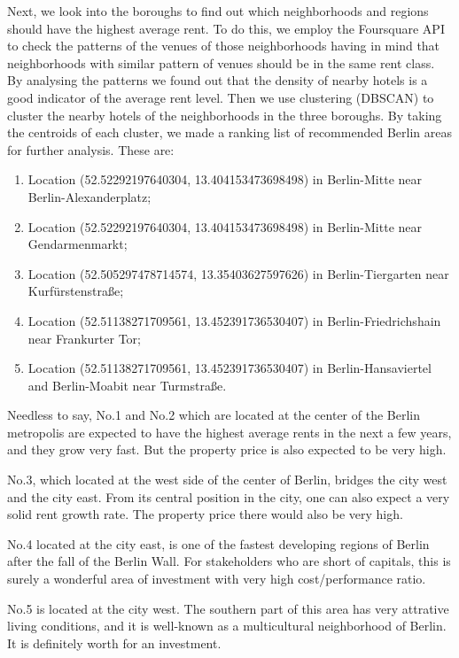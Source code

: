 \documentclass[11pt]{article}
\providecommand{\tightlist}{%
      \setlength{\itemsep}{0pt}\setlength{\parskip}{0pt}}
\begin{document}
    Next, we look into the boroughs to find out which neighborhoods and
regions should have the highest average rent. To do this, we employ the
Foursquare API to check the patterns of the venues of those
neighborhoods having in mind that neighborhoods with similar pattern of
venues should be in the same rent class. By analysing the patterns we
found out that the density of nearby hotels is a good indicator of the
average rent level. Then we use clustering (DBSCAN) to cluster the
nearby hotels of the neighborhoods in the three boroughs. By taking the
centroids of each cluster, we made a ranking list of recommended Berlin
areas for further analysis. These are:

\begin{enumerate}
\def\labelenumi{\arabic{enumi}.}
\tightlist
\item
  Location (52.52292197640304, 13.404153473698498) in Berlin-Mitte near
  Berlin-Alexanderplatz;
\item
  Location (52.52292197640304, 13.404153473698498) in Berlin-Mitte near
  Gendarmenmarkt;
\item
  Location (52.505297478714574, 13.35403627597626) in Berlin-Tiergarten
  near Kurfürstenstraße;
\item
  Location (52.51138271709561, 13.452391736530407) in
  Berlin-Friedrichshain near Frankurter Tor;
\item
  Location (52.51138271709561, 13.452391736530407) in
  Berlin-Hansaviertel and Berlin-Moabit near Turmstraße.
\end{enumerate}

    Needless to say, No.1 and No.2 which are located at the center of the
Berlin metropolis are expected to have the highest average rents in the
next a few years, and they grow very fast. But the property price is
also expected to be very high.

    No.3, which located at the west side of the center of Berlin, bridges
the city west and the city east. From its central position in the city,
one can also expect a very solid rent growth rate. The property price
there would also be very high.

    No.4 located at the city east, is one of the fastest developing regions
of Berlin after the fall of the Berlin Wall. For stakeholders who are
short of capitals, this is surely a wonderful area of investment with
very high cost/performance ratio.

    No.5 is located at the city west. The southern part of this area has
very attrative living conditions, and it is well-known as a
multicultural neighborhood of Berlin. It is definitely worth for an
investment.


    
    
    
\end{document}

